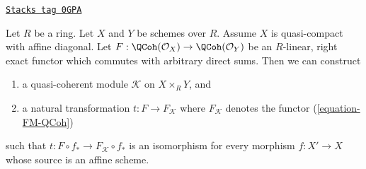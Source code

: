 \begin{lemma}
\label{functors-lemma-functor-quasi-coherent-from-affine-diagonal-pre}
\href{https://stacks.math.columbia.edu/tag/0GPA}{\texttt{Stacks tag 0GPA}}

Let $R$ be a ring. Let $X$ and $Y$ be schemes over $R$. Assume $X$
is quasi-compact with affine diagonal. Let
$F : \QCoh(\mathcal{O}_X) \to \QCoh(\mathcal{O}_Y)$
be an $R$-linear, right exact functor which commutes
with arbitrary direct sums. Then we can construct
\begin{enumerate}
\item a quasi-coherent module $\mathcal{K}$ on $X \times_R Y$, and
\item a natural transformation $t : F \to F_\mathcal{K}$
where $F_\mathcal{K}$ denotes the functor (\ref{equation-FM-QCoh})
\end{enumerate}
such that $t : F \circ f_* \to F_\mathcal{K} \circ f_*$ is an isomorphism
for every morphism $f : X' \to X$ whose source is an affine scheme.
\end{lemma}

